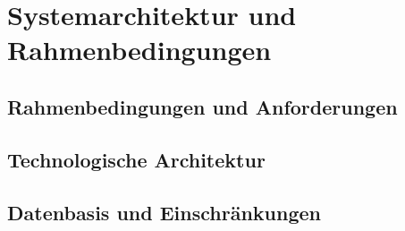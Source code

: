 \section{Systemarchitektur und Rahmenbedingungen}

\subsection{Rahmenbedingungen und Anforderungen}

\subsection{Technologische Architektur}

\subsection{Datenbasis und Einschränkungen}
